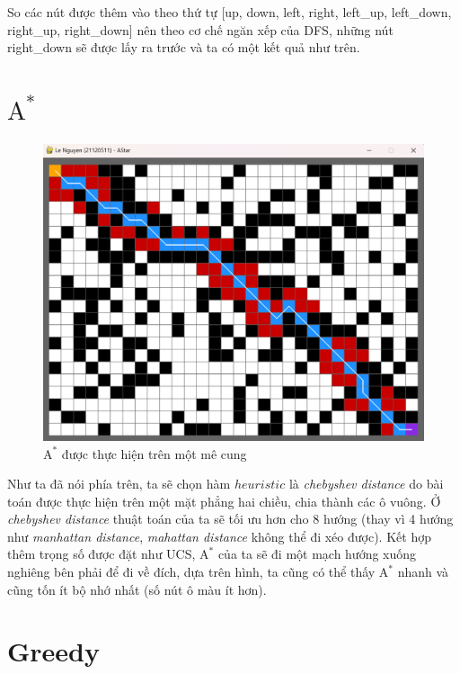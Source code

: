 So các nút được thêm vào theo thứ tự [up, down, left, right, left\_up, left\_down, right\_up, right\_down] nên theo cơ chế ngăn xếp của DFS, những nút right\_down sẽ được lấy ra trước và ta có một kết quả như trên.

\section{$\text{A}^*$}

\begin{figure}[H]
    \centering
    \includegraphics[scale=0.7]{figure/Implementation/AStar.png}
    \caption{$\text{A}^{*}$ được thực hiện trên một mê cung}
    \label{fig:imple_AStar}
\end{figure}

Như ta đã nói phía trên, ta sẽ chọn hàm $heuristic$ là \textit{chebyshev distance} do bài toán được thực hiện trên một mặt phẳng hai chiều, chia thành các ô vuông. Ở \textit{chebyshev distance} thuật toán của ta sẽ tối ưu hơn cho 8 hướng (thay vì 4 hướng như \textit{manhattan distance}, \textit{mahattan distance} không thể đi xéo được). Kết hợp thêm trọng số được đặt như UCS, $\text{A}^*$ của ta sẽ đi một mạch hướng xuống nghiêng bên phải để đi về đích, dựa trên hình, ta cũng có thể thấy $\text{A}^*$ nhanh và cũng tốn ít bộ nhớ nhất (số nút ô màu ít hơn).

\section{Greedy}

